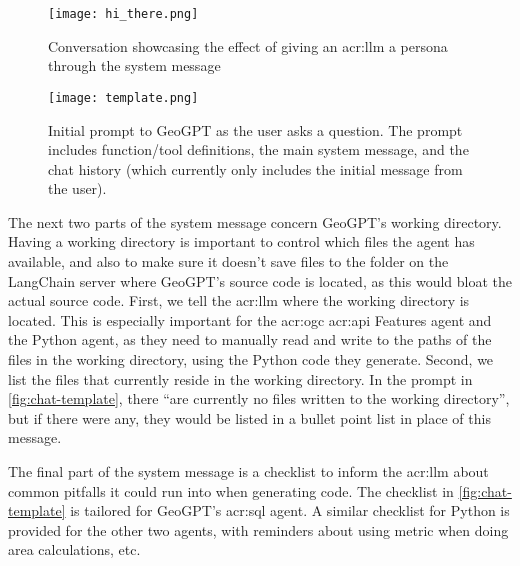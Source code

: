 \begin{figure}[H]
    \centering
    \texttt{[image: hi\_there.png]}
    \caption[LLM persona example]{Conversation showcasing the effect of giving an \acrshort{acr:llm} a persona through the system message}
    \label{fig:effect-of-system-message}
\end{figure}

\begin{figure}
    \centering
    \texttt{[image: template.png]}
    \caption[Initial prompt to GeoGPT as the user asks a question]{Initial prompt to GeoGPT as the user asks a question. The prompt includes function/tool definitions, the main system message, and the chat history (which currently only includes the initial message from the user).}
    \label{fig:chat-template}
\end{figure}

The next two parts of the system message concern GeoGPT's working directory. Having a working directory is important to control which files the agent has available, and also to make sure it doesn't save files to the folder on the LangChain server where GeoGPT's source code is located, as this would bloat the actual source code. First, we tell the \acrshort{acr:llm} where the working directory is located. This is especially important for the \acrshort{acr:ogc} \acrshort{acr:api} Features agent and the Python agent, as they need to manually read and write to the paths of the files in the working directory, using the Python code they generate. Second, we list the files that currently reside in the working directory. In the prompt in \autoref{fig:chat-template}, there \enquote{are currently no files written to the working directory}, but if there were any, they would be listed in a bullet point list in place of this message.

The final part of the system message is a checklist to inform the \acrshort{acr:llm} about common pitfalls it could run into when generating code. The checklist in \autoref{fig:chat-template} is tailored for GeoGPT's \acrshort{acr:sql} agent. A similar checklist for Python is provided for the other two agents, with reminders about using metric  when doing area calculations, etc.

